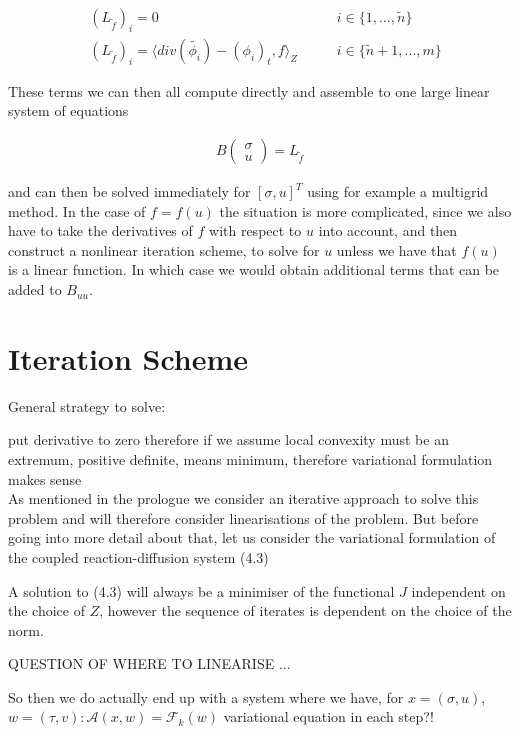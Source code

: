 \documentclass[../draft_1.tex]{subfiles}
\begin{document}
\begin{ceqn}
	\begin{align}
&(L_{\tilde{f}})_i = 0 \qquad &i \in \{1, ..., \tilde{n} \} \\
&(L_{\tilde{f}})_i = \langle div(\tilde{\phi_i}) - (\phi_i)_t, f \rangle_Z \qquad  &i \in \{\tilde{n}+1, ..., m\}
	\end{align}
\end{ceqn}
These terms we can then all compute directly and assemble to one large linear system of equations
\begin{ceqn}
	\begin{align}
B
\begin{pmatrix}
\sigma \\
u
\end{pmatrix} = L_{\tilde{f}}
	\end{align}
\end{ceqn}
and can then be solved immediately for $[\sigma, u]^T$ using for example a multigrid method. In the case of $f = f(u)$ the situation is more complicated, since we also have to take the derivatives of $f$ with respect to $u$ into account, and then construct a nonlinear iteration scheme, to solve for $u$ unless we have that $f(u)$ is a linear function. In which case we would obtain additional terms that can be added to $B_{uu}$. 

\section{Iteration Scheme}
General strategy to solve: 

put derivative to zero therefore if we assume local convexity must be an extremum, positive definite, means minimum, therefore variational formulation makes sense 
\bigskip
\\
As mentioned in the prologue we consider an iterative approach to solve this problem and will therefore consider linearisations of the problem. But before going into more detail about that, let us consider the variational formulation of the coupled reaction-diffusion system (4.3)

A solution to (4.3) will always be a minimiser of the functional $J$ independent on the choice of $Z$, however the sequence of iterates is dependent on the choice of the norm. 


QUESTION OF WHERE TO LINEARISE ...



So then we do actually end up with a system where we have, for $x = (\sigma, u)$, $w = (\tau, v) : \mathcal{A}(x, w) = \mathcal{F}_k(w)$ variational equation in each step?! 
\end{document}
